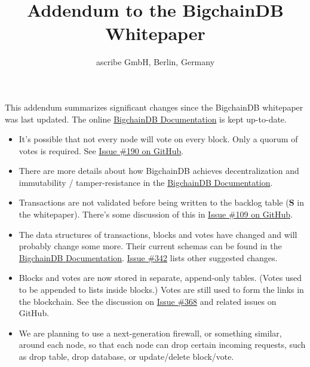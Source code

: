 \documentclass[a4paper]{article}
\title{Addendum to the BigchainDB Whitepaper}
\author{ascribe GmbH, Berlin, Germany}
\begin{document}

\maketitle

This addendum summarizes significant changes since the BigchainDB white\-paper was last updated. The online \href{https://bigchaindb.readthedocs.io/}{BigchainDB Documentation} is kept up-to-date.

\begin{itemize}
  \item It's possible that not every node will vote on every block. Only a quorum of votes is required. See \href{https://github.com/bigchaindb/bigchaindb/issues/190}{Issue \#190 on GitHub}.
  \item There are more details about how BigchainDB achieves decentralization and immutability / tamper-resistance in the \href{https://bigchaindb.readthedocs.io/en/latest/topic-guides/index.html}{BigchainDB Documentation}.
  \item Transactions are not validated before being written to the backlog table ($\mathbf{S}$ in the whitepaper). There's some discussion of this in \href{https://github.com/bigchaindb/bigchaindb/issues/109}{Issue \#109 on GitHub}.
  \item The data structures of transactions, blocks and votes have changed and will probably change some more. Their current schemas can be found in the \href{https://bigchaindb.readthedocs.io/en/latest/topic-guides/models.html}{BigchainDB Documentation}. \href{https://github.com/bigchaindb/bigchaindb/issues/342}{Issue \#342} lists other suggested changes.
  \item Blocks and votes are now stored in separate, append-only tables. (Votes used to be appended to lists inside blocks.) Votes are still used to form the links in the blockchain. See the discussion on \href{https://github.com/bigchaindb/bigchaindb/issues/368}{Issue \#368} and related issues on GitHub.
  \item We are planning to use a next-generation firewall, or something similar, around each node, so that each node can drop certain incoming requests, such as drop table, drop database, or update/delete block/vote.
\end{itemize}
\end{document}
